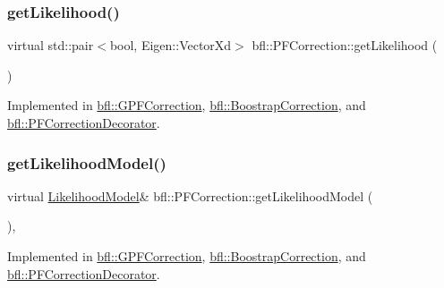 \subsubsection{\texorpdfstring{get\+Likelihood()}{getLikelihood()}}
{\footnotesize\ttfamily virtual std\+::pair$<$bool, Eigen\+::\+Vector\+Xd$>$ bfl\+::\+P\+F\+Correction\+::get\+Likelihood (\begin{DoxyParamCaption}{ }\end{DoxyParamCaption})\hspace{0.3cm}{\ttfamily [pure virtual]}}



Implemented in \mbox{\hyperlink{classbfl_1_1GPFCorrection_a0df1185be7731e9077eec265b8d6ff8e}{bfl\+::\+G\+P\+F\+Correction}}, \mbox{\hyperlink{classbfl_1_1BoostrapCorrection_a18ad4ccfd9d7cf008011cbc79a0cea8f}{bfl\+::\+Boostrap\+Correction}}, and \mbox{\hyperlink{classbfl_1_1PFCorrectionDecorator_a019f207b8348f5f61e700e8a4ca38bfd}{bfl\+::\+P\+F\+Correction\+Decorator}}.

\mbox{\label{classbfl_1_1PFCorrection_ad812d0b488e0882b246dd19d4f6818e1}} 
\subsubsection{\texorpdfstring{get\+Likelihood\+Model()}{getLikelihoodModel()}}
{\footnotesize\ttfamily virtual \mbox{\hyperlink{classbfl_1_1LikelihoodModel}{Likelihood\+Model}}\& bfl\+::\+P\+F\+Correction\+::get\+Likelihood\+Model (\begin{DoxyParamCaption}{ }\end{DoxyParamCaption})\hspace{0.3cm}{\ttfamily [protected]}, {}}



Implemented in \mbox{\hyperlink{classbfl_1_1GPFCorrection_afa1e971c9b618c50bd98f1d5774cff3a}{bfl\+::\+G\+P\+F\+Correction}}, \mbox{\hyperlink{classbfl_1_1BoostrapCorrection_aae2f5698ba37895b6193f51441f96f38}{bfl\+::\+Boostrap\+Correction}}, and \mbox{\hyperlink{classbfl_1_1PFCorrectionDecorator_ae58be7d0fedf9b56afb994211fb4ee6a}{bfl\+::\+P\+F\+Correction\+Decorator}}.

\mbox{\label{classbfl_1_1PFCorrection_a891c7d498caffb4d11e5ebdaa475c683}} 
